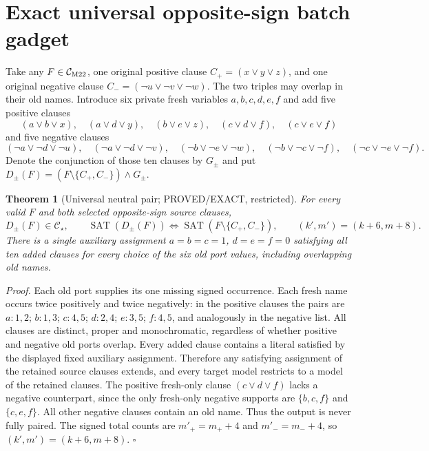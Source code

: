 \documentclass[11pt]{article}
\newtheorem{theorem}{Theorem}
\begin{document}
\section{Exact universal opposite-sign batch gadget}
Take any $F\in\mathcal C_{\rm M22}$, one original positive clause $C_+=(x\vee y\vee z)$, and one original negative clause $C_-=(\neg u\vee\neg v\vee\neg w)$. The two triples may overlap in their old names. Introduce six private fresh variables $a,b,c,d,e,f$ and add five positive clauses
\[
(a\vee b\vee x),\quad(a\vee d\vee y),\quad(b\vee e\vee z),\quad
(c\vee d\vee f),\quad(c\vee e\vee f)
\]
and five negative clauses
\[
(\neg a\vee\neg d\vee\neg u),\quad
(\neg a\vee\neg d\vee\neg v),\quad
(\neg b\vee\neg e\vee\neg w),\quad
(\neg b\vee\neg c\vee\neg f),\quad
(\neg c\vee\neg e\vee\neg f).
\]
Denote the conjunction of those ten clauses by $G_{\pm}$ and put
$D_{\pm}(F)=(F\setminus\{C_+,C_-\})\wedge G_{\pm}$.
\begin{theorem}[Universal neutral pair; PROVED/EXACT, restricted]
For every valid $F$ and both selected opposite-sign source clauses,
\[
D_{\pm}(F)\in\mathcal C_\star,\qquad
\operatorname{SAT}(D_{\pm}(F))\iff
\operatorname{SAT}(F\setminus\{C_+,C_-\}),
\qquad(k',m')=(k+6,m+8).
\]
There is a single auxiliary assignment $a=b=c=1$, $d=e=f=0$ satisfying all ten added clauses for \emph{every} choice of the six old port values, including overlapping old names.
\end{theorem}
\noindent\emph{Proof.} Each old port supplies its one missing signed occurrence. Each fresh name occurs twice positively and twice negatively: in the positive clauses the pairs are $a:1,2$; $b:1,3$; $c:4,5$; $d:2,4$; $e:3,5$; $f:4,5$, and analogously in the negative list. All clauses are distinct, proper and monochromatic, regardless of whether positive and negative old ports overlap. Every added clause contains a literal satisfied by the displayed fixed auxiliary assignment. Therefore any satisfying assignment of the retained source clauses extends, and every target model restricts to a model of the retained clauses. The positive fresh-only clause $(c\vee d\vee f)$ lacks a negative counterpart, since the only fresh-only negative supports are $\{b,c,f\}$ and $\{c,e,f\}$. All other negative clauses contain an old name. Thus the output is never fully paired. The signed total counts are $m'_+=m_++4$ and $m'_-=m_-+4$, so $(k',m')=(k+6,m+8)$. \hfill$\square$
\end{document}
